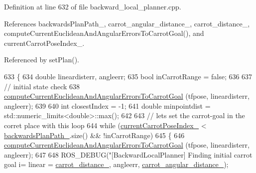 Definition at line 632 of file backward\+\_\+local\+\_\+planner.\+cpp.



References backwards\+Plan\+Path\+\_\+, carrot\+\_\+angular\+\_\+distance\+\_\+, carrot\+\_\+distance\+\_\+, compute\+Current\+Euclidean\+And\+Angular\+Errors\+To\+Carrot\+Goal(), and current\+Carrot\+Pose\+Index\+\_\+.



Referenced by set\+Plan().


\begin{DoxyCode}
633         \{
634             \textcolor{keywordtype}{double} lineardisterr, angleerr;
635             \textcolor{keywordtype}{bool} inCarrotRange = \textcolor{keyword}{false};
636 
637             \textcolor{comment}{// initial state check}
638             \hyperlink{classcl__move__base__z_1_1backward__local__planner_1_1BackwardLocalPlanner_ad39ba029c760fc63ea286c74b5b9b795}{computeCurrentEuclideanAndAngularErrorsToCarrotGoal}
      (tfpose, lineardisterr, angleerr);
639 
640             \textcolor{keywordtype}{int} closestIndex = -1;
641             \textcolor{keywordtype}{double} minpointdist = std::numeric\_limits<double>::max();
642 
643             \textcolor{comment}{// lets set the carrot-goal in the corret place with this loop}
644             \textcolor{keywordflow}{while} (\hyperlink{classcl__move__base__z_1_1backward__local__planner_1_1BackwardLocalPlanner_a2e8f2b78bc97f27c5fa431f3af2261ed}{currentCarrotPoseIndex\_} < 
      \hyperlink{classcl__move__base__z_1_1backward__local__planner_1_1BackwardLocalPlanner_ad9cde5c85f782cab2ddb4030e3c3f2cf}{backwardsPlanPath\_}.size() && !inCarrotRange)
645             \{
646                 \hyperlink{classcl__move__base__z_1_1backward__local__planner_1_1BackwardLocalPlanner_ad39ba029c760fc63ea286c74b5b9b795}{computeCurrentEuclideanAndAngularErrorsToCarrotGoal}
      (tfpose, lineardisterr, angleerr);
647 
648                 ROS\_DEBUG(\textcolor{stringliteral}{"[BackwardLocalPlanner] Finding initial carrot goal i=%
       linear = %
      \hyperlink{classcl__move__base__z_1_1backward__local__planner_1_1BackwardLocalPlanner_a0bbb80ce5bae865c4322869422803296}{carrot\_distance\_}, angleerr, \hyperlink{classcl__move__base__z_1_1backward__local__planner_1_1BackwardLocalPlanner_a63e30befa09c4a67cf55086923b760c7}{carrot\_angular\_distance\_});
}
\end{DoxyCode}
